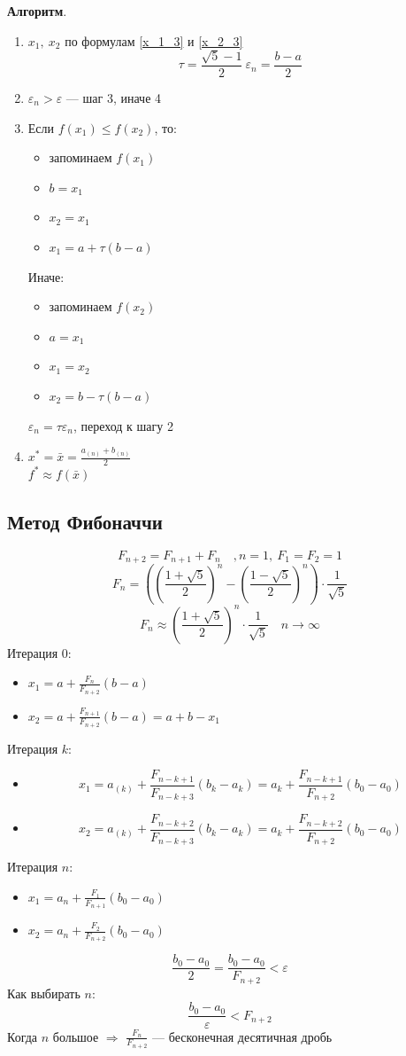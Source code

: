 \documentclass[oneside]{book}
\theoremstyle{plain}
\theoremstyle{remark}
\theoremstyle{definition}
\begin{document}
\textbf{Алгоритм}.
\begin{enumerate}
\item \(x_1,\ x_2\) по формулам \ref{x_1_3} и \ref{x_2_3}
\[ \tau = \frac{\sqrt{5} - 1}{2}\ \varepsilon_n = \frac{b - a}{2} \]
\item \(\varepsilon_n > \varepsilon\) --- шаг 3, иначе 4
\item Если \(f(x_1) \le f(x_2)\), то:
\begin{itemize}
\item запоминаем \(f(x_1)\)
\item \(b = x_1\)
\item \(x_2 = x_1\)
\item \(x_1 = a + \tau(b - a)\)
\end{itemize}
Иначе:
\begin{itemize}
\item запоминаем \(f(x_2)\)
\item \(a = x_1\)
\item \(x_1 = x_2\)
\item \(x_2 = b - \tau(b - a)\)
\end{itemize}
\(\varepsilon_n = \tau\varepsilon_n\), переход к шагу 2
\item \(x^* = \bar{x} = \frac{a_{(n)} + b_{(n)}}{2}\) \\
\(f^* \approx f(\bar{x})\)
\end{enumerate}
\subsection{Метод Фибоначчи}
\label{sec:orge9827cb}
\[ F_{n + 2} = F_{n + 1} + F_n\quad, n = 1,\ F_1 = F_2 = 1 \]
\[ F_n = \left(\left(\frac{1 + \sqrt{5}}{2}\right)^n - \left(\frac{1 - \sqrt{5}}{2}\right)^n\right)\cdot\frac{1}{\sqrt{5}} \]
\[ F_n \approx \left(\frac{1 + \sqrt{5}}{2}\right)^n \cdot \frac{1}{\sqrt{5}} \quad n \to \infty \]
Итерация 0:
\begin{itemize}
\item \(x_1 = a + \frac{F_n}{F_{n + 2}} (b - a)\)
\item \(x_2 = a + \frac{F_{n + 1}}{F_{n + 2}}(b - a) = a + b - x_1\)
\end{itemize}
Итерация \(k\):
\begin{itemize}
\item \[ x_1 = a_{(k)} + \frac{F_{n - k + 1}}{F_{n - k + 3}}(b_k - a_k) = a_k + \frac{F_{n -k + 1}}{F_{n + 2}}(b_0 - a_0) \]
\item \[ x_2 = a_{(k)} + \frac{F_{n - k + 2}}{F_{n - k + 3}}(b_k - a_k) = a_k + \frac{F_{n -k + 2}}{F_{n + 2}}(b_0 - a_0) \]
\end{itemize}
Итерация \(n\):
\begin{itemize}
\item \(x_1 = a_n + \frac{F_1}{F_{n + 1}}(b_0 - a_0)\)
\item \(x_2 = a_n + \frac{F_2}{F_{n + 2}}(b_0 - a_0)\)
\end{itemize}
\[ \frac{b_0 - a_0}{2} = \frac{b_0 - a_0}{F_{n + 2}} < \varepsilon \]
Как выбирать \(n\):
\[ \frac{b_0 - a_0}{\varepsilon} < F_{n + 2} \]
Когда \(n\) большое \(\Rightarrow\) \(\frac{F_n}{F_{n + 2}}\) --- бесконечная десятичная дробь
\end{document}

